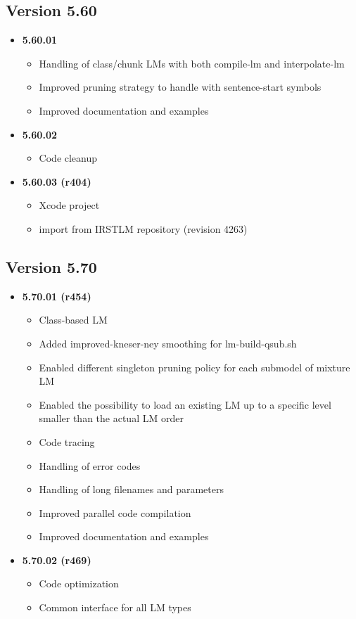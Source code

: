 \subsection{Version 5.60}
\begin{itemize}
\item {\bf 5.60.01}
\begin{itemize}
\item Handling of class/chunk LMs with both compile-lm and interpolate-lm
\item Improved pruning strategy to handle with sentence-start symbols
\item Improved documentation and examples
\end{itemize}
\item {\bf 5.60.02}
\begin{itemize}
\item Code cleanup 
\end{itemize}
\item {\bf 5.60.03 (r404)}
\begin{itemize}
\item Xcode project
\item import from IRSTLM repository (revision 4263)
\end{itemize}

\end{itemize}

\subsection{Version 5.70}
\begin{itemize}
\item {\bf 5.70.01 (r454)}
\begin{itemize}
\item Class-based LM
\item Added improved-kneser-ney smoothing for lm-build-qsub.sh
\item Enabled different singleton pruning policy for each submodel of mixture LM
\item Enabled the possibility to load an existing LM up to a specific level smaller than the actual LM order
\item Code tracing
\item Handling of error codes
\item Handling of long filenames and parameters
\item Improved parallel code compilation
\item Improved documentation and examples
\end{itemize}
\item {\bf 5.70.02 (r469)}
\begin{itemize}
\item Code optimization
\item Common interface for all LM types
\end{itemize}
\end{itemize}

